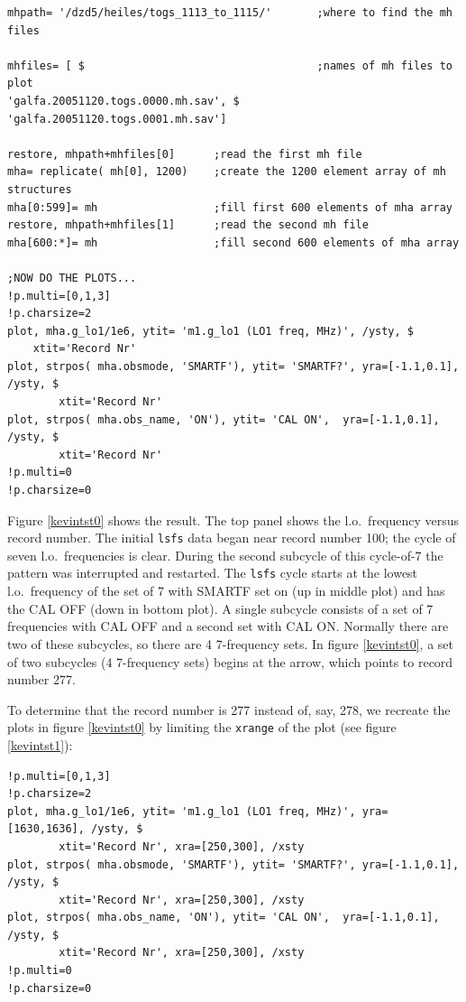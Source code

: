 \documentclass[psfig,preprint]{aastex}
\begin{document}
{\begin{verbatim}
mhpath= '/dzd5/heiles/togs_1113_to_1115/'       ;where to find the mh files

mhfiles= [ $                                    ;names of mh files to plot
'galfa.20051120.togs.0000.mh.sav', $
'galfa.20051120.togs.0001.mh.sav']

restore, mhpath+mhfiles[0]      ;read the first mh file
mha= replicate( mh[0], 1200)    ;create the 1200 element array of mh structures
mha[0:599]= mh                  ;fill first 600 elements of mha array
restore, mhpath+mhfiles[1]      ;read the second mh file
mha[600:*]= mh                  ;fill second 600 elements of mha array

;NOW DO THE PLOTS...
!p.multi=[0,1,3]
!p.charsize=2
plot, mha.g_lo1/1e6, ytit= 'm1.g_lo1 (LO1 freq, MHz)', /ysty, $
	xtit='Record Nr'
plot, strpos( mha.obsmode, 'SMARTF'), ytit= 'SMARTF?', yra=[-1.1,0.1], /ysty, $
        xtit='Record Nr'
plot, strpos( mha.obs_name, 'ON'), ytit= 'CAL ON',  yra=[-1.1,0.1], /ysty, $
        xtit='Record Nr'
!p.multi=0
!p.charsize=0
\end{verbatim}

	Figure \ref{kevintst0} shows the result. The top panel shows the
l.o.\ frequency versus record number. The initial \verb$lsfs$ data began
near record number 100; the cycle of seven l.o.\ frequencies is clear.
During the second subcycle of this cycle-of-7 the pattern was
interrupted and restarted. The \verb$lsfs$ cycle starts at the lowest
l.o.\ frequency of the set of 7 with SMARTF set on (up in middle plot) 
and has the CAL OFF (down in bottom plot). A single subcycle consists of
a set of 7 frequencies with CAL OFF and a second set with CAL ON.
Normally there are two of these subcycles, so there are 4 7-frequency
sets. In figure \ref{kevintst0}, a set of two subcycles (4 7-frequency
sets) begins at the arrow, which points to record number 277.

	To determine that the record number is 277 instead of, say,
278, we recreate the plots in figure \ref{kevintst0} by limiting the
\verb$xrange$ of the plot (see figure \ref{kevintst1}):

\begin{verbatim}
!p.multi=[0,1,3]
!p.charsize=2
plot, mha.g_lo1/1e6, ytit= 'm1.g_lo1 (LO1 freq, MHz)', yra=[1630,1636], /ysty, $
        xtit='Record Nr', xra=[250,300], /xsty
plot, strpos( mha.obsmode, 'SMARTF'), ytit= 'SMARTF?', yra=[-1.1,0.1], /ysty, $
        xtit='Record Nr', xra=[250,300], /xsty
plot, strpos( mha.obs_name, 'ON'), ytit= 'CAL ON',  yra=[-1.1,0.1], /ysty, $
        xtit='Record Nr', xra=[250,300], /xsty
!p.multi=0
!p.charsize=0
\end{verbatim}

}
\end{document}
